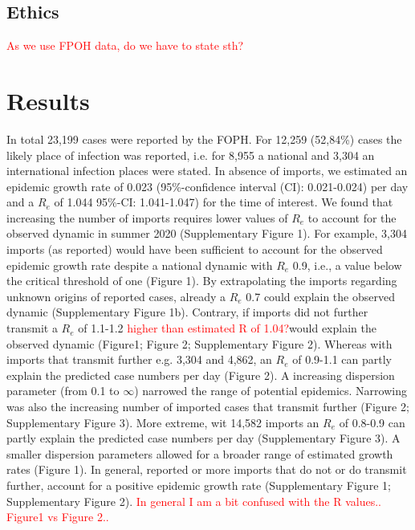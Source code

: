 \documentclass[10pt, a4paper, twoside]{article}
\begin{document}
\begin{multicols}{2}
\subsection{Ethics}
\textcolor{red}{As we use FPOH data, do we have to state sth?}

\section{Results}
In total 23,199 cases were reported by the FOPH. For 12,259 (52,84\%) cases the likely place of infection was reported, i.e. for 8,955 a national and 3,304 an international infection places were stated. In absence of imports, we estimated an epidemic growth rate of 0.023 (95\%-confidence interval (CI): 0.021-0.024) per day and a $R_e$ of 1.044 95\%-CI: 1.041-1.047) for the time of interest. We found that increasing the number of imports requires lower values of $R_e$ to account for the observed dynamic in summer 2020 (Supplementary Figure 1). For example, 3,304 imports (as reported) would have been sufficient to account for the observed epidemic growth rate despite a national dynamic with $R_e$ 0.9, i.e., a value below the critical threshold of one (Figure 1). By extrapolating the imports regarding unknown origins of reported cases, already a $R_e$ 0.7 could explain the observed dynamic (Supplementary Figure 1b). Contrary, if imports did not further transmit a $R_e$ of 1.1-1.2 \textcolor{red}{higher than estimated R of 1.04?}would explain the observed dynamic (Figure1; Figure 2; Supplementary Figure 2). Whereas with imports that transmit further e.g. 3,304 and 4,862, an $R_e$ of 0.9-1.1 can partly explain the predicted case numbers per day (Figure 2). A increasing dispersion parameter (from 0.1 to $\infty$) narrowed the range of potential epidemics. Narrowing was also the increasing number of imported cases that transmit further (Figure 2; Supplementary Figure 3).
More extreme, wit 14,582 imports an $R_e$ of 0.8-0.9 can partly explain the predicted case numbers per day (Supplementary Figure 3). A smaller dispersion parameters allowed for a broader range of estimated growth rates (Figure 1). In general, reported or more imports that do not or do transmit further, account for a positive epidemic growth rate (Supplementary Figure 1; Supplementary Figure 2).
\textcolor{red}{In general I am a bit confused with the R values.. Figure1 vs Figure 2..}

\end{multicols}
\end{document}

